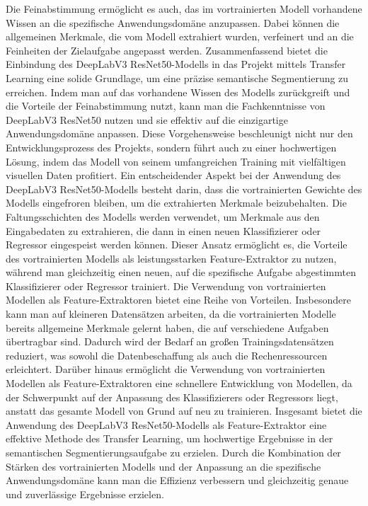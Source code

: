     Die Feinabstimmung ermöglicht es auch, das im vortrainierten Modell vorhandene Wissen an die spezifische Anwendungsdomäne anzupassen.
    Dabei können die allgemeinen Merkmale, die vom Modell extrahiert wurden, verfeinert und an die Feinheiten der Zielaufgabe angepasst werden.
    Zusammenfassend bietet die Einbindung des DeepLabV3 ResNet50-Modells in das Projekt mittels Transfer Learning eine solide Grundlage, um eine präzise semantische Segmentierung zu erreichen. 
    Indem man auf das vorhandene Wissen des Modells zurückgreift und die Vorteile der Feinabstimmung nutzt, kann man die Fachkenntnisse von DeepLabV3 ResNet50 nutzen und sie effektiv auf die einzigartige Anwendungsdomäne anpassen. 
    Diese Vorgehensweise beschleunigt nicht nur den Entwicklungsprozess des Projekts, sondern führt auch zu einer hochwertigen Lösung, indem das Modell von seinem umfangreichen Training mit vielfältigen visuellen Daten profitiert.
    Ein entscheidender Aspekt bei der Anwendung des DeepLabV3 ResNet50-Modells besteht darin, dass die vortrainierten Gewichte des Modells eingefroren bleiben, um die extrahierten Merkmale beizubehalten. 
    Die Faltungsschichten des Modells werden verwendet, um Merkmale aus den Eingabedaten zu extrahieren, die dann in einen neuen Klassifizierer oder Regressor eingespeist werden können. 
    Dieser Ansatz ermöglicht es, die Vorteile des vortrainierten Modells als leistungsstarken Feature-Extraktor zu nutzen, während man gleichzeitig einen neuen, auf die spezifische Aufgabe abgestimmten Klassifizierer oder Regressor trainiert.
    Die Verwendung von vortrainierten Modellen als Feature-Extraktoren bietet eine Reihe von Vorteilen. Insbesondere kann man auf kleineren Datensätzen arbeiten, da die vortrainierten Modelle bereits allgemeine Merkmale gelernt haben, die auf verschiedene Aufgaben übertragbar sind. 
    Dadurch wird der Bedarf an großen Trainingsdatensätzen reduziert, was sowohl die Datenbeschaffung als auch die Rechenressourcen erleichtert. 
    Darüber hinaus ermöglicht die Verwendung von vortrainierten Modellen als Feature-Extraktoren eine schnellere Entwicklung von Modellen, da der Schwerpunkt auf der Anpassung des Klassifizierers oder Regressors liegt, anstatt das gesamte Modell von Grund auf neu zu trainieren.
    Insgesamt bietet die Anwendung des DeepLabV3 ResNet50-Modells als Feature-Extraktor eine effektive Methode des Transfer Learning, um hochwertige Ergebnisse in der semantischen Segmentierungsaufgabe zu erzielen. 
    Durch die Kombination der Stärken des vortrainierten Modells und der Anpassung an die spezifische Anwendungsdomäne kann man die Effizienz verbessern und gleichzeitig genaue und zuverlässige Ergebnisse erzielen.
